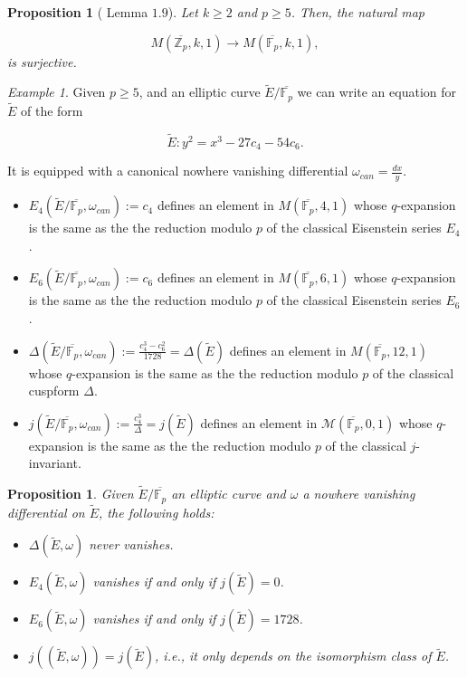 \documentclass[13pt]{amsart}
\newtheorem{proposition}[theorem]{Proposition}
\theoremstyle{remark}
\newtheorem*{example}{Example}
\numberwithin{theorem}{section} \numberwithin{equation}{section}
\begin{document}
\begin{proposition}[\cite{Edixhoven2} Lemma $1.9$] Let $k \ge 2$ and $p \ge 5$. 
Then, the natural map
 
 \[ M(\overline{{\mathbb{Z}}_{p}},k,1) \rightarrow M(\overline{\mathbb{F}_p},k,1) ,\]
 is surjective.
\end{proposition}

\begin{example}
Given $p \ge 5$, and an elliptic curve $\tilde{E}/\overline{\mathbb{F}_p}$ we can write an equation for $\tilde{E}$ of the form

\[ \tilde{E}: y^2=x^3-27c_{4}-54c_{6}  .\]

It is equipped with a canonical nowhere vanishing differential $\omega_{can}= \frac{dx}{y}$.

  
 \begin{itemize}
 
  
  \item $E_{4}(\tilde{E}/\overline{\mathbb{F}_p},\omega_{can}):= c_{4}$ 
defines an element  in $M(\overline{\mathbb{F}_p},4,1)$ whose $q$-expansion is the same 
as 
the
the reduction modulo $p$ of the classical Eisenstein series $E_{4}$.
   \item $E_{6}(\tilde{E}/\overline{\mathbb{F}_p},\omega_{can}):= c_{6}$ 
defines an element  in $M(\overline{\mathbb{F}_p},6,1)$ whose $q$-expansion is the same 
as 
the
the reduction modulo $p$ of the classical Eisenstein series $E_{6}$.
\item  $\Delta(\tilde{E}/\overline{\mathbb{F}_p},\omega_{can}):= 
\frac{c_{4}^3-c_{6}^2}{1728}=\Delta(\tilde{E})$ defines an element  in 
$M(\overline{\mathbb{F}_p},12,1)$ whose $q$-expansion is the same as the
the reduction modulo $p$ of the classical cuspform $\Delta$.
\item  $j(\tilde{E}/\overline{\mathbb{F}_p},\omega_{can}):= 
\frac{c_{4}^3}{\Delta}=j(\tilde{E})$ defines an element  in 
$\mathcal{M}(\overline{\mathbb{F}_p},0,1)$ whose $q$-expansion is the same as the
the reduction modulo $p$ of the classical $j$-invariant.
 \end{itemize}

 
\end{example}

\begin{proposition} \label{prop:nonvanishing}
 Given $\tilde{E} / \overline{\mathbb{F}_p}$ an elliptic curve and $\omega$ a nowhere 
vanishing differential on $\tilde{E}$, the following holds:
 \begin{itemize}
  \item  $\Delta(\tilde{E},\omega)$ never vanishes.
  \item  $ E_{4}(\tilde{E},\omega)$ vanishes if and only if $j(\tilde{E})=0$.
  \item $E_{6}(\tilde{E},\omega)$ vanishes if and only if $j(\tilde{E})=1728$.
  \item $j((\tilde{E},\omega))=j(\tilde{E})$, i.e., it only depends on the isomorphism class of $\tilde{E}$.
  
 \end{itemize}

 
\end{proposition}
\end{document}

